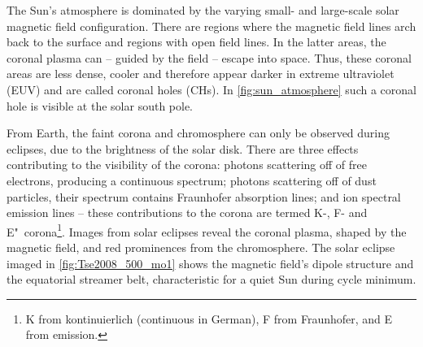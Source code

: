 The Sun's atmosphere is dominated by the varying small- and large-scale solar magnetic field configuration. There are regions where the magnetic field lines arch back to the surface and regions with open field lines. In the latter areas, the coronal plasma can -- guided by the field -- escape into space. Thus, these coronal areas are less dense, cooler and therefore appear darker in extreme ultraviolet (EUV) and are called coronal holes (CHs). In \autoref{fig:sun_atmosphere} such a coronal hole is visible at the solar south pole.

From Earth, the faint corona and chromosphere can only be observed during eclipses, due to the brightness of the solar disk. There are three effects contributing to the visibility of the corona: photons scattering off of free electrons, producing a continuous spectrum; photons scattering off of dust particles, their spectrum contains Fraunhofer absorption lines; and ion spectral emission lines -- these contributions to the corona are termed K-, F- and E"~corona\footnote{K from kontinuierlich (continuous in German), F from Fraunhofer, and E from emission.}.
Images from solar eclipses reveal the coronal plasma, shaped by the magnetic field, and red prominences from the chromosphere. The solar eclipse imaged in \autoref{fig:Tse2008_500_mo1} shows the magnetic field's dipole structure and the equatorial streamer belt, characteristic for a quiet Sun during cycle minimum.
